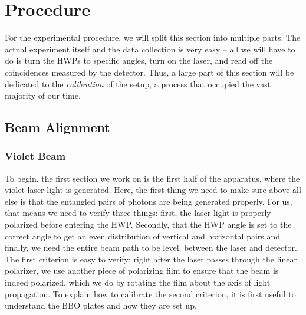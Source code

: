 \documentclass[10pt]{article}
\begin{document}
	\section{Procedure}

	For the experimental procedure, we will split this section into multiple parts. The actual experiment
	itself and the data collection is very easy -- all we will have to do is turn the HWPs to
	specific angles, turn on the laser, and read off the coincidences measured by the detector. Thus, a large
	part of this section will be dedicated to the \textit{calibration} of the setup, a process that occupied
	the vast majority of our time. 
	
	\subsection{Beam Alignment}
	
	\subsubsection{Violet Beam}

	To begin, the first section we work on is the first half of the apparatus, where the violet laser light
	is generated. Here, the first thing we need to make sure above all else is that the entangled pairs of
	photons are being generated properly. For us, that means we need to verify three things: first, the laser
	light is properly polarized before entering the HWP. Secondly, that the HWP angle is
	set to the correct angle to get an even distribution of vertical and horizontal pairs and finally, we
	need the entire beam path to be level, between the laser and detector. The first criterion
	is easy to verify: right after the laser passes through the linear polarizer, we use another piece of
	polarizing film to ensure that the beam is indeed polarized, which we do by rotating the film about the
	axis of light propagation. To explain how to calibrate the second criterion, it is first useful to
	understand the BBO plates and how they are set up.   
\end{document}
